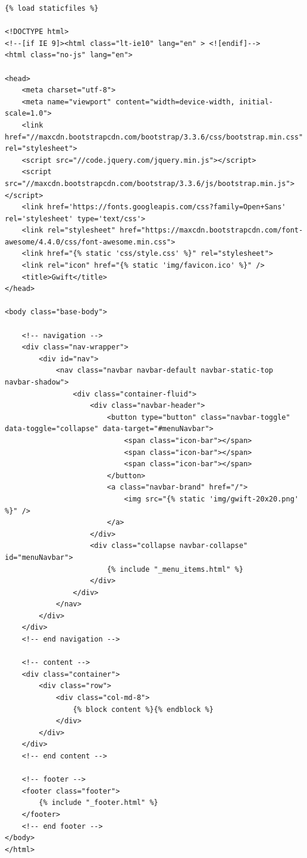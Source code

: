 \documentclass[11pt]{amsbook}
\begin{document}
\begin{verbatim}
{% load staticfiles %}

<!DOCTYPE html>
<!--[if IE 9]><html class="lt-ie10" lang="en" > <![endif]-->
<html class="no-js" lang="en">

<head>
    <meta charset="utf-8">
    <meta name="viewport" content="width=device-width, initial-scale=1.0">
    <link href="//maxcdn.bootstrapcdn.com/bootstrap/3.3.6/css/bootstrap.min.css" rel="stylesheet">
    <script src="//code.jquery.com/jquery.min.js"></script>
    <script src="//maxcdn.bootstrapcdn.com/bootstrap/3.3.6/js/bootstrap.min.js"></script>
    <link href='https://fonts.googleapis.com/css?family=Open+Sans' rel='stylesheet' type='text/css'>
    <link rel="stylesheet" href="https://maxcdn.bootstrapcdn.com/font-awesome/4.4.0/css/font-awesome.min.css">
    <link href="{% static 'css/style.css' %}" rel="stylesheet">
    <link rel="icon" href="{% static 'img/favicon.ico' %}" />
    <title>Gwift</title>
</head>

<body class="base-body">

    <!-- navigation -->
    <div class="nav-wrapper">
        <div id="nav">
            <nav class="navbar navbar-default navbar-static-top navbar-shadow">
                <div class="container-fluid">
                    <div class="navbar-header">
                        <button type="button" class="navbar-toggle" data-toggle="collapse" data-target="#menuNavbar">
                            <span class="icon-bar"></span>
                            <span class="icon-bar"></span>
                            <span class="icon-bar"></span>
                        </button>
                        <a class="navbar-brand" href="/">
                            <img src="{% static 'img/gwift-20x20.png' %}" />
                        </a>
                    </div>
                    <div class="collapse navbar-collapse" id="menuNavbar">
                        {% include "_menu_items.html" %}
                    </div>
                </div>
            </nav>
        </div>
    </div>
    <!-- end navigation -->

    <!-- content -->
    <div class="container">
        <div class="row">
            <div class="col-md-8">
                {% block content %}{% endblock %}
            </div>
        </div>
    </div>
    <!-- end content -->

    <!-- footer -->
    <footer class="footer">
        {% include "_footer.html" %}
    </footer>
    <!-- end footer -->
</body>
</html>
\end{verbatim}
\end{document}
